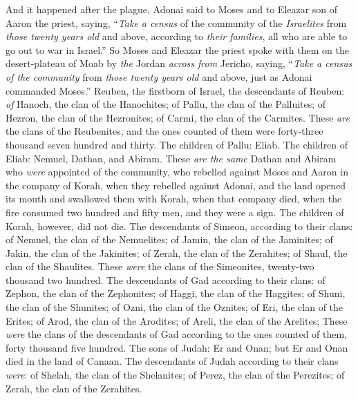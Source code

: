 \begin{biblechapter} %
  And it happened after the plague, Adonai said to Moses and to Eleazar son of Aaron the priest, saying,
\verse “\textit{Take a census} of the community of the \textit{Israelites} from \textit{those twenty years old} and above, according to \textit{their families}, all who are able to go out to war in Israel.”
\verse So Moses and Eleazar the priest spoke with them on the desert-plateau of Moab by \textit{the} Jordan \textit{across from} Jericho, saying,
\verse “\textit{Take a census of the community} from \textit{those twenty years old} and above, just as Adonai commanded Moses.”
\verse Reuben, the firstborn of Israel, the descendants of Reuben: \textit{of} Hanoch, the clan of the Hanochites; of Pallu, the clan of the Palluites;
\verse of Hezron, the clan of the Hezronites; of Carmi, the clan of the Carmites.
\verse These \textit{are} the clans of the Reubenites, and the ones counted of them were forty-three thousand seven hundred and thirty.
\verse The children of Pallu: Eliab.
\verse The children of Eliab: Nemuel, Dathan, and Abiram. These \textit{are the same} Dathan and Abiram who \textit{were} appointed of the community, who rebelled against Moses and Aaron in the company of Korah, when they rebelled against Adonai,
\verse and the land opened its mouth and swallowed them with Korah, when that company died, when the fire consumed two hundred and fifty men, and they were a sign.
\verse The children of Korah, however, did not die.
\verse The descendants of Simeon, according to their clans: of Nemuel, the clan of the Nemuelites; of Jamin, the clan of the Jaminites; of Jakin, the clan of the Jakinites;
\verse of Zerah, the clan of the Zerahites; of Shaul, the clan of the Shaulites.
\verse These \textit{were} the clans of the Simeonites, twenty-two thousand two hundred.
\verse The descendants of Gad according to their clans: of Zephon, the clan of the Zephonites; of Haggi, the clan of the Haggites; of Shuni, the clan of the Shunites;
\verse of Ozni, the clan of the Oznites; of Eri, the clan of the Erites;
\verse of Arod, the clan of the Arodites; of Areli, the clan of the Arelites;
\verse These \textit{were} the clans of the descendants of Gad according to the ones counted of them, forty thousand five hundred.
\verse The sons of Judah: Er and Onan; but Er and Onan died in the land of Canaan.
\verse The descendants of Judah according to their clans \textit{were}: of Shelah, the clan of the Shelanites; of Perez, the clan of the Perezites; of Zerah, the clan of the Zerahites.

\end{biblechapter}
